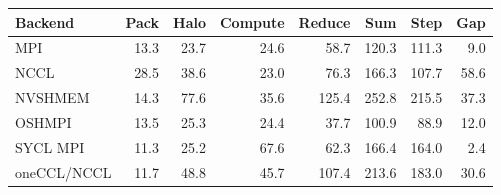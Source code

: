 \begin{tabular}{lrrrrrrr}
\toprule
Backend & Pack & Halo & Compute & Reduce & Sum & Step & Gap\\
\midrule
MPI & 13.3 & 23.7 & 24.6 & 58.7 & 120.3 & 111.3 & 9.0\\
NCCL & 28.5 & 38.6 & 23.0 & 76.3 & 166.3 & 107.7 & 58.6\\
NVSHMEM & 14.3 & 77.6 & 35.6 & 125.4 & 252.8 & 215.5 & 37.3\\
OSHMPI & 13.5 & 25.3 & 24.4 & 37.7 & 100.9 & 88.9 & 12.0\\
SYCL MPI & 11.3 & 25.2 & 67.6 & 62.3 & 166.4 & 164.0 & 2.4\\
oneCCL/NCCL & 11.7 & 48.8 & 45.7 & 107.4 & 213.6 & 183.0 & 30.6\\
\bottomrule
\end{tabular}

